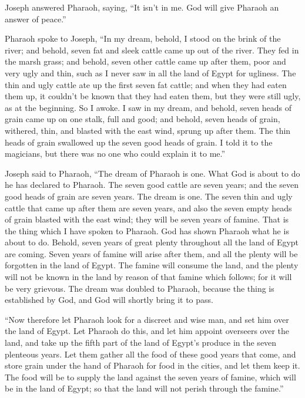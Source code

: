 \myverse{}Joseph answered Pharaoh, saying, “It isn’t in me. God will give Pharaoh an answer of peace.”

\myverse{}Pharaoh spoke to Joseph, “In my dream, behold, I stood on the brink of the river;   \myverse{}and behold, seven fat and sleek cattle came up out of the river. They fed in the marsh grass;   \myverse{}and behold, seven other cattle came up after them, poor and very ugly and thin, such as I never saw in all the land of Egypt for ugliness.   \myverse{}The thin and ugly cattle ate up the first seven fat cattle;   \myverse{}and when they had eaten them up, it couldn’t be known that they had eaten them, but they were still ugly, as at the beginning. So I awoke.   \myverse{}I saw in my dream, and behold, seven heads of grain came up on one stalk, full and good;   \myverse{}and behold, seven heads of grain, withered, thin, and blasted with the east wind, sprung up after them.   \myverse{}The thin heads of grain swallowed up the seven good heads of grain. I told it to the magicians, but there was no one who could explain it to me.”

\myverse{}Joseph said to Pharaoh, “The dream of Pharaoh is one. What God is about to do he has declared to Pharaoh. \myverse{}The seven good cattle are seven years; and the seven good heads of grain are seven years. The dream is one.   \myverse{}The seven thin and ugly cattle that came up after them are seven years, and also the seven empty heads of grain blasted with the east wind; they will be seven years of famine.   \myverse{}That is the thing which I have spoken to Pharaoh. God has shown Pharaoh what he is about to do.   \myverse{}Behold, seven years of great plenty throughout all the land of Egypt are coming.   \myverse{}Seven years of famine will arise after them, and all the plenty will be forgotten in the land of Egypt. The famine will consume the land,   \myverse{}and the plenty will not be known in the land by reason of that famine which follows; for it will be very grievous.   \myverse{}The dream was doubled to Pharaoh, because the thing is established by God, and God will shortly bring it to pass.

\myverse{}“Now therefore let Pharaoh look for a discreet and wise man, and set him over the land of Egypt.   \myverse{}Let Pharaoh do this, and let him appoint overseers over the land, and take up the fifth part of the land of Egypt’s produce in the seven plenteous years.   \myverse{}Let them gather all the food of these good years that come, and store grain under the hand of Pharaoh for food in the cities, and let them keep it.   \myverse{}The food will be to supply the land against the seven years of famine, which will be in the land of Egypt; so that the land will not perish through the famine.”


